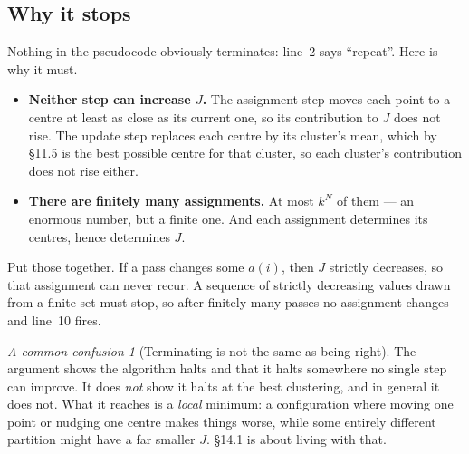 \documentclass[11pt]{article}
\theoremstyle{plain}
\theoremstyle{definition}
\theoremstyle{remark}
\newtheorem*{warn}{A common confusion}
\begin{document}
\subsection{Why it stops}
Nothing in the pseudocode obviously terminates: line~2 says ``repeat''. Here is
why it must.

\begin{itemize}[leftmargin=1.4em,itemsep=4pt]
  \item \textbf{Neither step can increase $J$.} The assignment step moves each
        point to a centre at least as close as its current one, so its
        contribution to $J$ does not rise. The update step replaces each centre
        by its cluster's mean, which by \S11.5 is the best possible centre for
        that cluster, so each cluster's contribution does not rise either.
  \item \textbf{There are finitely many assignments.} At most $k^{N}$ of them
        --- an enormous number, but a finite one. And each assignment determines
        its centres, hence determines $J$.
\end{itemize}

\noindent Put those together. If a pass changes some $a(i)$, then $J$ strictly
decreases, so that assignment can never recur. A sequence of strictly decreasing
values drawn from a finite set must stop, so after finitely many passes no
assignment changes and line~10 fires.

\begin{warn}[Terminating is not the same as being right]
The argument shows the algorithm halts and that it halts somewhere no single
step can improve. It does \emph{not} show it halts at the best clustering, and
in general it does not. What it reaches is a \emph{local} minimum: a
configuration where moving one point or nudging one centre makes things worse,
while some entirely different partition might have a far smaller $J$. \S14.1 is
about living with that.
\end{warn}

\end{document}
